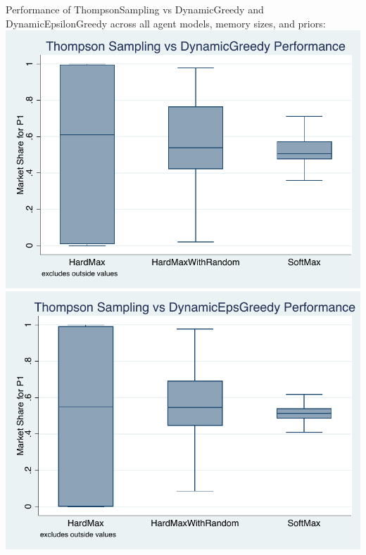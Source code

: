 \documentclass[11pt,letterpaper]{article}
\begin{document}
Performance of ThompsonSampling vs DynamicGreedy and DynamicEpsilonGreedy across all agent models, memory sizes, and priors: \\
\includegraphics[scale=0.75]{ts_perf_dg} \\
\includegraphics[scale=0.75]{ts_perf_deg} \\
\end{document}
